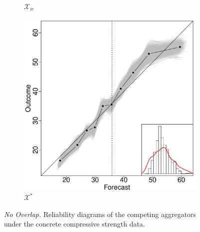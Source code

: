 \documentclass[11pt]{article}
\theoremstyle{definition}
\theoremstyle{definition}
\begin{document}
\begin{figure}
\begin{subfigure}[b]{0.323\textwidth}
                \caption{$\mathcal{X}_w$}
                \label{fig:gull}
        \end{subfigure}%
         \begin{subfigure}[b]{0.323\textwidth}
                \includegraphics[width=\textwidth]{IndependentE-OLP}
                \caption{$\mathcal{X}^*$}
                \label{RelDiagramNoE}
             \end{subfigure}
        \caption{\textit{No Overlap.} Reliability diagrams of the competing aggregators under the concrete compressive strength data.}
                        \label{RelDiagramNo}
\end{figure}
\end{document}
